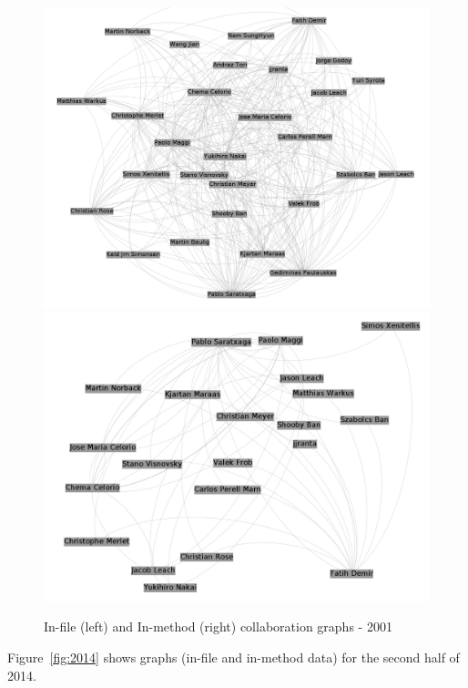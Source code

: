 \documentclass[a4paper]{article}
\begin{document}
\begin{figure}[h!]
\begin{center}
\includegraphics[scale=0.17]{g2001files.png} 
\includegraphics[scale=0.17]{g2001methods.png}
\caption{In-file (left) and In-method (right) collaboration graphs - 2001}
\label{fig:2001}
\end{center}
\end{figure}

Figure~\ref{fig:2014} shows graphs (in-file and in-method data) for the
second half of 2014.
\end{document}
